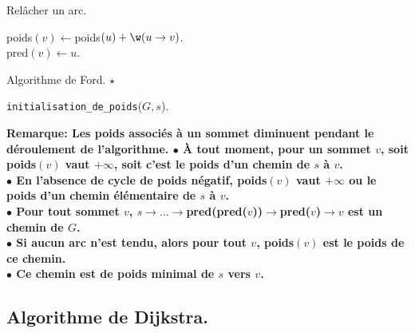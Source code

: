 \documentclass[french, 11pt]{article}
\begin{document}
\begin{defi}{Relâcher un arc.}{}
    \hspace*{0.28cm}\begin{algorithm}[H]
        \LinesNumbered
        \caption{Relâcher un arc.}
        poids$(v)\gets$poids$(u)+\w(u\to v)$.\\
        pred$(v)\gets u$.
    \end{algorithm}
\end{defi}

\vspace*{-0.7cm}

\begin{defi}{Algorithme de Ford. $\star$}{}
    \hspace*{0.28cm}\begin{algorithm}[H]
        \LinesNumbered
        \caption{Algorithme de Ford.}
        \texttt{initialisation\_de\_poids}($G,s$).\\
    \end{algorithm}
    \bf{Remarque:} Les poids associés à un sommet diminuent pendant le déroulement de l'algorithme.\n
    $\bullet$ À tout moment, pour un sommet $v$, soit poids$(v)$ vaut $+\infty$, soit c'est le poids d'un chemin de $s$ à $v$.\\
    $\bullet$ En l'absence de cycle de poids négatif, poids$(v)$ vaut $+\infty$ ou le poids d'un chemin élémentaire de $s$ à $v$.\\
    $\bullet$ Pour tout sommet $v$, $s\to...\to$pred(pred($v$))$\to$pred($v$)$\to v$ est un chemin de $G$.\\
    $\bullet$ Si aucun arc n'est tendu, alors pour tout $v$, poids$(v)$ est le poids de ce chemin.\\
    $\bullet$ Ce chemin est de poids minimal de $s$ vers $v$.
\end{defi}

\subsection{Algorithme de Dijkstra.}
\end{document}
